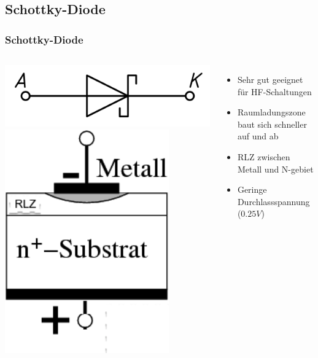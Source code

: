 \subsection*{Schottky-Diode}
\begin{frame}
    \frametitle{Schottky-Diode}
    \begin{columns}[c]
        \begin{center}
            \includegraphics[width=1\textwidth,height=.3\textheight,keepaspectratio]{a05/Diode-Schottky-EN_A-K.png}\\
            \includegraphics[width=0.8\textwidth,height=.6\textheight,keepaspectratio]{a05/AusfuerungsformenSchottkyDiode.png}
            \tiny \hyperlink{refs}{\cite{wm}}
        \end{center}
    \begin{itemize}
			\item Sehr gut geeignet für HF-Schaltungen
			\item Raumladungszone baut sich schneller auf und ab
			\item RLZ zwischen Metall und N-gebiet
			\item Geringe Durchlassspannung ($0.25V$)
    \end{itemize}
    \end{columns}
\end{frame}

